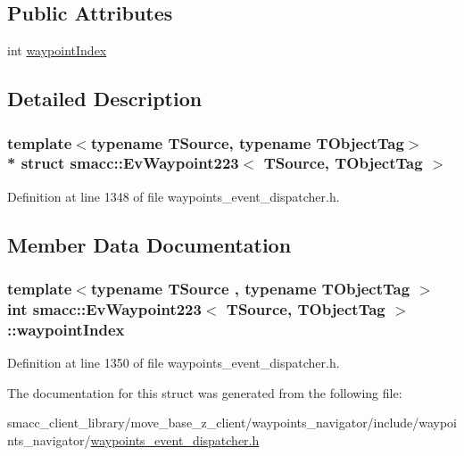 \subsection*{Public Attributes}
\begin{DoxyCompactItemize}
\item 
int \hyperlink{structsmacc_1_1EvWaypoint223_a5eff6627df49603484b3fef6325daef8}{waypoint\+Index}
\end{DoxyCompactItemize}


\subsection{Detailed Description}
\subsubsection*{template$<$typename T\+Source, typename T\+Object\+Tag$>$\\*
struct smacc\+::\+Ev\+Waypoint223$<$ T\+Source, T\+Object\+Tag $>$}



Definition at line 1348 of file waypoints\+\_\+event\+\_\+dispatcher.\+h.



\subsection{Member Data Documentation}
\subsubsection[{\texorpdfstring{waypoint\+Index}{waypointIndex}}]{\setlength{\rightskip}{0pt plus 5cm}template$<$typename T\+Source , typename T\+Object\+Tag $>$ int {\bf smacc\+::\+Ev\+Waypoint223}$<$ T\+Source, T\+Object\+Tag $>$\+::waypoint\+Index}\hypertarget{structsmacc_1_1EvWaypoint223_a5eff6627df49603484b3fef6325daef8}{}\label{structsmacc_1_1EvWaypoint223_a5eff6627df49603484b3fef6325daef8}


Definition at line 1350 of file waypoints\+\_\+event\+\_\+dispatcher.\+h.



The documentation for this struct was generated from the following file\+:\begin{DoxyCompactItemize}
\item 
smacc\+\_\+client\+\_\+library/move\+\_\+base\+\_\+z\+\_\+client/waypoints\+\_\+navigator/include/waypoints\+\_\+navigator/\hyperlink{waypoints__event__dispatcher_8h}{waypoints\+\_\+event\+\_\+dispatcher.\+h}\end{DoxyCompactItemize}
